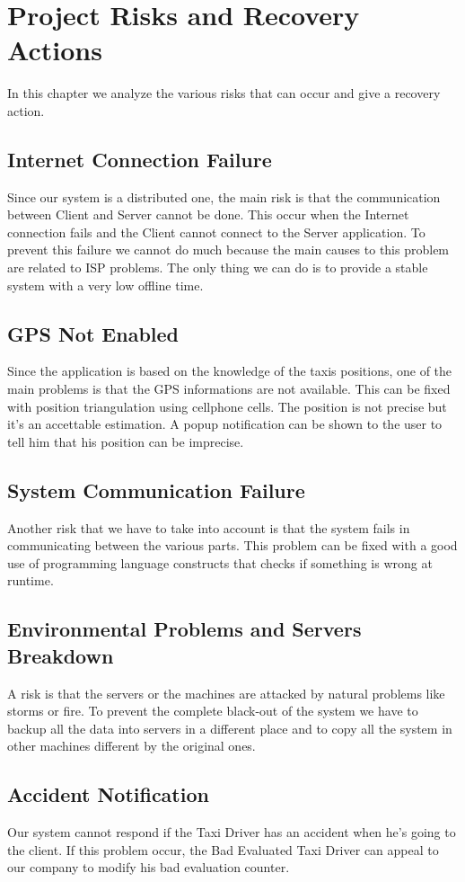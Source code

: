 \documentclass[../../projectPlan.tex]{subfiles}
\begin{document}
	\chapter{Project Risks and Recovery Actions}

		In this chapter we analyze the various risks that can occur and give a recovery action.

		\section{Internet Connection Failure}
			Since our system is a distributed one, the main risk is that the communication between Client and Server cannot be done.
			This occur when the Internet connection fails and the Client cannot connect to the Server application. To prevent this failure we cannot do much because the main causes to this problem are related to ISP problems. The only thing we can do is to provide a stable system with a very low offline time.

		\section{GPS Not Enabled}
			Since the application is based on the knowledge of the taxis positions, one of the main problems is that the GPS informations are not available.
			This can be fixed with position triangulation using cellphone cells. The position is not precise but it's an accettable estimation.
			A popup notification can be shown to the user to tell him that his position can be imprecise.

		\section{System Communication Failure}
			Another risk that we have to take into account is that the system fails in communicating between the various parts. This problem can be fixed with a good use of programming language constructs that checks if something is wrong at runtime.

		\section{Environmental Problems and Servers Breakdown}
			A risk is that the servers or the machines are attacked by natural problems like storms or fire.
			To prevent the complete black-out of the system we have to backup all the data into servers in a different place and to copy all the system in other machines different by the original ones.

		\section{Accident Notification}
			Our system cannot respond if the Taxi Driver has an accident when he's going to the client. If this problem occur, the Bad Evaluated Taxi Driver can appeal to our company to modify his bad evaluation counter.
\end{document}
